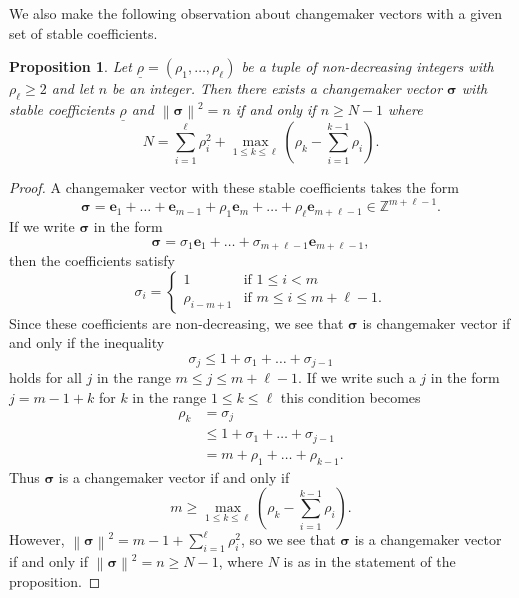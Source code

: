 \documentclass{amsart} %
\newcommand{\Z}{\mathbb{Z}}
\newcommand{\e}{\bm{e}}
\newcommand{\bsigma}{\bm{\sigma}}
\newcommand{\norm}[1]{\left\lVert #1 \right\rVert^2}
\theoremstyle{thm}
\newtheorem{prop}[Theorem]{Proposition}
\theoremstyle{definition}
\numberwithin{equation}{section}
\begin{document}
We also make the following observation about changemaker vectors with a given set of stable coefficients.
\begin{prop}\label{prop:CM_existence_bound}
Let $\underline{\rho}=(\rho_1, \dots, \rho_\ell)$ be a tuple of non-decreasing integers with $\rho_\ell \geq 2$ and let $n$ be an integer. 
Then there exists a changemaker vector $\bsigma$ with stable coefficients $\underline{\rho}$ and $\norm{\bsigma}=n$ if and only if $n\geq N-1$ where
\[
N=\sum_{i=1}^\ell \rho_i^2 + \max_{1\leq k \leq \ell} \left(\rho_k - \sum_{i=1}^{k-1} \rho_i \right).
\]
\end{prop}
\begin{proof}
A changemaker vector with these stable coefficients takes the form
\[
\bsigma = \e_{1} + \dots + \e_{m-1} + \rho_1 \e_{m} + \dots + \rho_\ell \e_{m+\ell-1}\in \Z^{m+\ell-1}.
\]
If we write $\bsigma$ in the form
\[
\bsigma = \sigma_1 \e_1 + \dots + \sigma_{m+\ell-1} \e_{m+\ell-1},
\]
then the coefficients satisfy
\[
\sigma_i=
\begin{cases}
1 &\text{if $1\leq i <m$}\\
\rho_{i-m+1} &\text{if $m\leq i \leq m+\ell-1$.}
\end{cases}
\]
Since these coefficients are non-decreasing, we see that $\bsigma$ is changemaker vector if and only if the inequality
\[
\sigma_j\leq 1+ \sigma_1 + \dots+\sigma_{j-1}
\]
holds for all $j$ in the range $m\leq j \leq m+\ell-1$. If we write such a $j$ in the form $j=m-1+k$ for $k$ in the range $1\leq k\leq \ell$ this condition becomes
\begin{align*}
    \rho_{k}&=\sigma_j\\
    &\leq 1+ \sigma_1 + \dots+\sigma_{j-1}\\
    &=m+\rho_{1}+\dots + \rho_{k-1}.
\end{align*}
Thus $\bsigma$ is a changemaker vector if and only if 
\[
m\geq \max_{1\leq k \leq \ell} \left(\rho_k - \sum_{i=1}^{k-1} \rho_i \right).
\]
However, $\norm{\bsigma}= m-1 + \sum_{i=1}^\ell \rho_i^2$, so we see that $\bsigma$ is a changemaker vector if and only if
$\norm{\bsigma}=n\geq N-1$, where $N$ is as in the statement of the proposition.
\end{proof}
\end{document}
